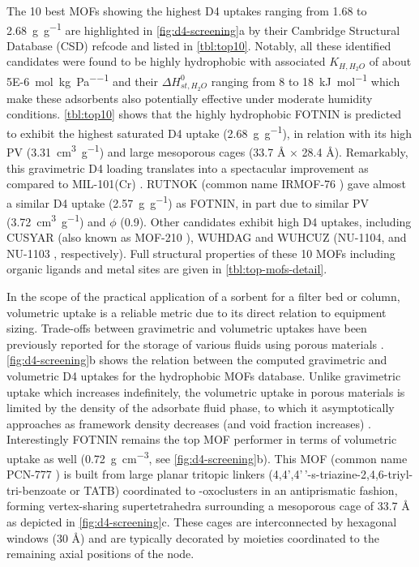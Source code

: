 The 10 best MOFs showing the highest D4 uptakes ranging from 1.68 to
\SI{2.68}{\gram\per\gram} are highlighted in \cref{fig:d4-screening}a by their
Cambridge Structural Database (CSD) \citep{allenCambridgeStructuralDatabase2002}
refcode and listed in \cref{tbl:top10}. Notably, all these identified candidates
were found to be highly hydrophobic with associated \(K_{H,H_{2}O}\) of about
\SI{5E-6}{\mol\per\kilo\gram\per\pascal} and their \(\Delta H_{st,H_{2}O}^{0}\)
ranging from 8 to \SI{18}{\kilo\joule\per\mol} which make these adsorbents also
potentially effective under moderate humidity conditions. \cref{tbl:top10} shows
that the highly hydrophobic FOTNIN is predicted to exhibit the highest saturated
D4 uptake (\SI{2.68}{\gram\per\gram}), in relation with its high PV
(\SI{3.31}{\centi\metre\cubed\per\gram}) and large mesoporous cages (33.7 Å ×
28.4 Å). Remarkably, this gravimetric D4 loading translates into a spectacular
improvement as compared to MIL-101(Cr)
\citep{gargiuloChromiumbasedMIL101Metal2019}. RUTNOK (common name IRMOF-76
\citep{oisakiMetalOrganicFramework2010}) gave almost a similar D4 uptake
(\SI{2.57}{\gram\per\gram}) as FOTNIN, in part due to similar PV
(\SI{3.72}{\centi\metre\cubed\per\gram}) and \(\phi\) (0.9). Other candidates
exhibit high D4 uptakes, including CUSYAR (also known as MOF-210
\citep{furukawaUltrahighPorosityMetalOrganic2010}), WUHDAG and WUHCUZ (NU-1104,
and NU-1103 \citep{wangUltrahighSurfaceArea2015}, respectively). Full structural
properties of these 10 MOFs including organic ligands and metal sites are given
in \cref{tbl:top-mofs-detail}.

In the scope of the practical application of a sorbent for a filter bed or
column, volumetric uptake is a reliable metric due to its direct relation to
equipment sizing. Trade-offs between gravimetric and volumetric uptakes have
been previously reported for the storage of various fluids using porous
materials \citep{moghadamComputeraidedDiscoveryMetal2018}.
\cref{fig:d4-screening}b shows the relation between the computed gravimetric and
volumetric D4 uptakes for the hydrophobic MOFs database. Unlike gravimetric
uptake which increases indefinitely, the volumetric uptake in porous materials
is limited by the density of the adsorbate fluid phase, to which it
asymptotically approaches as framework density decreases (and void fraction
increases) \citep{bobbittHighthroughputScreeningMetal2016}. Interestingly FOTNIN
remains the top MOF performer in terms of volumetric uptake as well
(\SI{0.72}{\gram\per\centi\metre\cubed}, see \cref{fig:d4-screening}b). This MOF
(common name PCN-777 \citep{fengHighlyStableZeotype2015}) is built from large
planar tritopic linkers (4,4',4'\,'-s-triazine-2,4,6-triyl-tri-benzoate or TATB)
coordinated to -oxoclusters in an antiprismatic fashion, forming
vertex-sharing supertetrahedra surrounding a mesoporous cage of 33.7 Å as
depicted in \cref{fig:d4-screening}c. These cages are interconnected by
hexagonal windows (30 Å) and are typically decorated by  moieties
coordinated to the remaining axial positions of the  node.

